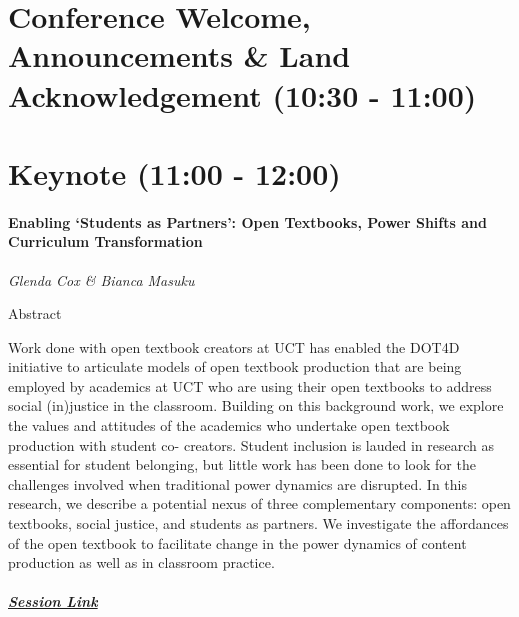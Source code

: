 \documentclass[
]{book}
\begin{document}
\hypertarget{conference-welcome-announcements-land-acknowledgement-1030---1100}{%
\section*{Conference Welcome, Announcements \& Land Acknowledgement (10:30 - 11:00)}\label{conference-welcome-announcements-land-acknowledgement-1030---1100}}

\hypertarget{keynote-1100---1200}{%
\section*{Keynote (11:00 - 12:00)}\label{keynote-1100---1200}}

\begin{keynote}
\hypertarget{enabling-students-as-partners-open-textbooks-power-shifts-and-curriculum-transformation}{%
\paragraph*{Enabling `Students as Partners': Open Textbooks, Power
Shifts and Curriculum
Transformation}\label{enabling-students-as-partners-open-textbooks-power-shifts-and-curriculum-transformation}}

\emph{Glenda Cox \& Bianca Masuku}

Abstract

Work done with open textbook creators at UCT has enabled the DOT4D
initiative to articulate models of open textbook production that are
being employed by academics at UCT who are using their open textbooks to
address social (in)justice in the classroom. Building on this background
work, we explore the values and attitudes of the academics who undertake
open textbook production with student co- creators. Student inclusion is
lauded in research as essential for student belonging, but little work
has been done to look for the challenges involved when traditional power
dynamics are disrupted. In this research, we describe a potential nexus
of three complementary components: open textbooks, social justice, and
students as partners. We investigate the affordances of the open
textbook to facilitate change in the power dynamics of content
production as well as in classroom practice.

\hypertarget{session-link}{%
\subparagraph*{\texorpdfstring{\href{}{Session
Link}}{Session Link}}\label{session-link}}
\end{keynote}
\end{document}
